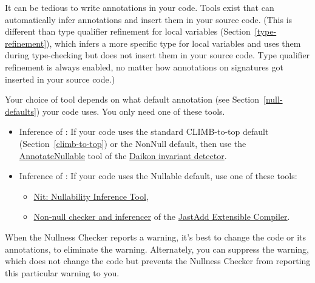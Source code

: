 
It can be tedious to write annotations in your code.  Tools exist that
can automatically infer annotations and insert them in your source code.
(This is different than type qualifier refinement for local variables
(Section~\ref{type-refinement}), which infers a more specific type for
local variables and uses them during type-checking but does not insert them
in your source code.  Type qualifier refinement is always enabled, no
matter how annotations on signatures got inserted in your source code.)

Your choice of tool depends on what default annotation (see
Section~\ref{null-defaults}) your code uses.  You only need one of these tools.

\begin{itemize}

\item
  Inference of :
  If your code uses the standard CLIMB-to-top default (Section~\ref{climb-to-top}) or
  the NonNull default, then use the
  \href{http://plse.cs.washington.edu/daikon/download/doc/daikon.html#AnnotateNullable}{AnnotateNullable}
  tool of the \href{http://plse.cs.washington.edu/daikon/}{Daikon invariant
    detector}.

\item
  Inference of :
  If your code uses the Nullable default, use one of these tools:
\begin{itemize}
\item
  \href{http://nit.gforge.inria.fr}{Nit: Nullability Inference Tool},
\item
  \href{http://jastadd.org/jastadd-tutorial-examples/non-null-types-for-java/}{Non-null
    checker and inferencer} of the \href{http://jastadd.org/}{JastAdd
    Extensible Compiler}.
\end{itemize}

\end{itemize}




When the Nullness Checker reports a warning, it's best to change the code
or its annotations, to eliminate the warning.  Alternately, you can
suppress the warning, which does not change the code but prevents the
Nullness Checker from reporting this particular warning to you.

